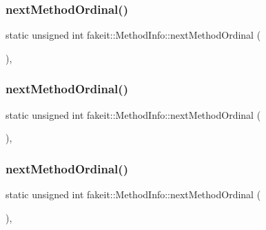 \subsubsection{\texorpdfstring{nextMethodOrdinal()}{nextMethodOrdinal()}\hspace{0.1cm}{\footnotesize\ttfamily [1/9]}}
{\footnotesize\ttfamily static unsigned int fakeit\+::\+Method\+Info\+::next\+Method\+Ordinal (\begin{DoxyParamCaption}{ }\end{DoxyParamCaption})\hspace{0.3cm}{\ttfamily [inline]}, {\ttfamily [static]}}

\mbox{\label{structfakeit_1_1MethodInfo_a751eb2c61420418115bda68345258c8c}} 
\subsubsection{\texorpdfstring{nextMethodOrdinal()}{nextMethodOrdinal()}\hspace{0.1cm}{\footnotesize\ttfamily [2/9]}}
{\footnotesize\ttfamily static unsigned int fakeit\+::\+Method\+Info\+::next\+Method\+Ordinal (\begin{DoxyParamCaption}{ }\end{DoxyParamCaption})\hspace{0.3cm}{\ttfamily [inline]}, {\ttfamily [static]}}

\mbox{\label{structfakeit_1_1MethodInfo_a751eb2c61420418115bda68345258c8c}} 
\subsubsection{\texorpdfstring{nextMethodOrdinal()}{nextMethodOrdinal()}\hspace{0.1cm}{\footnotesize\ttfamily [3/9]}}
{\footnotesize\ttfamily static unsigned int fakeit\+::\+Method\+Info\+::next\+Method\+Ordinal (\begin{DoxyParamCaption}{ }\end{DoxyParamCaption})\hspace{0.3cm}{\ttfamily [inline]}, {\ttfamily [static]}}

